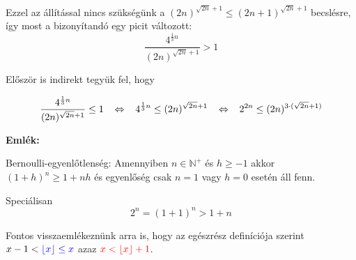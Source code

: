 \documentclass[12pt]{book}
\theoremstyle{plain} %
\theoremstyle{definition} %
\theoremstyle{remark}
\numberwithin{equation}{section}  %
\def\N{\mathbb{N}}
\begin{document}
	Ezzel az állítással nincs szükségünk a $(2n)^{\sqrt{2n}+1} \leq (2n+1)^{\sqrt{2n}+1}$ becslésre, így most a bizonyítandó egy picit változott:
	\[ \dfrac{4^{\frac{1}{3}n}}{(2n)^{\sqrt{2n}+1}} > 1 \]
	
	Először is indirekt tegyük fel, hogy 
	
	\begin{equation}\label{equi}
		\dfrac{4^{\frac{1}{3}n}}{(2n)^{\sqrt{2n}+1}} \leq 1 \hspace{3mm} \Leftrightarrow \hspace{3mm} 4^{\frac{1}{3}n} \leq (2n)^{\sqrt{2n}+1} \hspace{3mm} \Leftrightarrow \hspace{3mm} 2^{2n} \leq (2n)^{3\cdot (\sqrt{2n} + 1)} 
	\end{equation}
	
	\textbf{Emlék:}
	
	Bernoulli-egyenlőtlenség: Amennyiben $n\in \N^+$ és $h\geq -1$ akkor $(1+h)^n \geq 1+nh$ és egyenlőség csak $n=1$ vagy $h=0$ esetén áll fenn.
	
	Speciálisan
	\begin{equation}\label{bern}
		2^n = (1+1)^n > 1+n
	\end{equation}
	
	Fontos visszaemlékeznünk arra is, hogy az egészrész definíciója szerint $x - 1 < \color{blue} \lfloor x \rfloor \leq x \color{black}$ azaz $\color{red} x<\lfloor x \rfloor + 1 \color{black}$.
	
\end{document}
